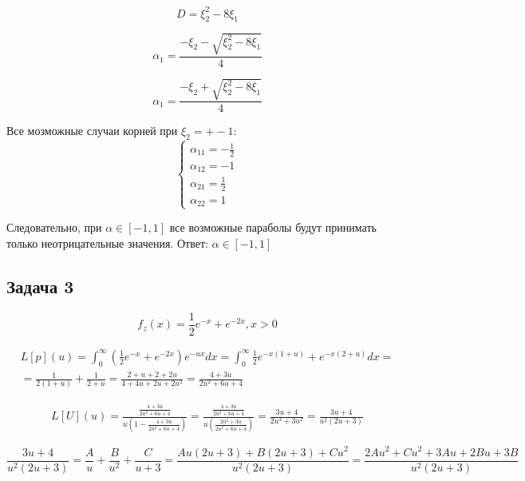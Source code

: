 \documentclass[a4paper,12pt]{article}
\begin{document}
\[ D = \xi_2^2 - 8\xi_1 \]

\[ \alpha_1 = \frac{-\xi_2 - \sqrt{\xi_2^2 - 8\xi_1}}{4} \]

\[ \alpha_1 = \frac{-\xi_2 + \sqrt{\xi_2^2 - 8\xi_1}}{4} \]


Все мозможные случаи корней при $ \xi_2 = +- 1 $:
\[ 
\begin{cases}
\alpha_{11} = -\frac{1}{2}\\
\alpha_{12} = -1\\
\alpha_{21} = \frac{1}{2}\\
\alpha_{22} = 1
\end{cases}
\]

Следовательно, при $ \alpha \in [-1, 1] $ все возможные параболы будут принимать только неотрицательные значения.
Ответ:  $ \alpha \in [-1, 1] $ 

\subsection{Задача 3}

\[  f _ { z } ( x ) = \frac { 1 } { 2 } e ^ { - x } + e ^ { - 2 x } , x > 0  \]

\begin{equation}
\begin{aligned}  L [ p ] ( u ) = \int _ { 0 } ^ { \infty } \left( \frac { 1 } { 2 } e ^ { - x } + e ^ { - 2 x } \right) e ^ { - u x } d x  = \int _ { 0 } ^ { \infty } \frac { 1 } { 2 } e ^ { - x ( 1 + u ) } + e ^ { - x ( 2 + u ) } d x = \\ = \frac { 1 } { 2 ( 1 + u ) } + \frac { 1 } { 2 + u } = \frac { 2 + u + 2 + 2 u } { 4 + 4 u + 2 u + 2 u ^ { 2 } } =  \frac { 4 + 3 u } { 2 u ^ { 2 } + 6 u + 4 } \end{aligned}
\end{equation}

\begin{equation}
\begin{aligned}
L [ U ] ( u ) = \frac { \frac { 4 + 3 u } { 2 u ^ { 2 } + 6 u + 4 } } { u \left( 1 - \frac { 4 + 3 u } { 2 u ^ { 2 } + 6 u + 4 } \right) } = \frac { \frac { 4 + 3 u } { 2 u ^ { 2 } + 6 u + 4 } } { u \left( \frac { 2 u ^ { 2 } + 3 u } { 2 u ^ { 2 } + 6 u + 4 } \right) }= \frac { 3 u + 4 } { 2 u ^ { 3 } + 3 u ^ { 2 } } = \frac { 3 u  + 4 } { u ^ { 2 } ( 2 u + 3 ) } 
\end{aligned}
\end{equation}




\[ 
\frac { 3 u + 4 } { u ^ { 2 } ( 2 u + 3 ) } = \frac { A } { u } + \frac { B } { u ^ { 2 } } + \frac { C } { u + 3 }  = \frac { A u ( 2 u + 3 ) + B ( 2 u + 3 ) + C u ^ { 2 } } { u ^ { 2 } ( 2 u + 3 ) } = \frac { 2 A u ^ { 2 } + C u ^ { 2 } + 3 A u + 2 B u + 3 B } { u ^ { 2 } ( 2 u + 3 ) }
\]
\end{document}
